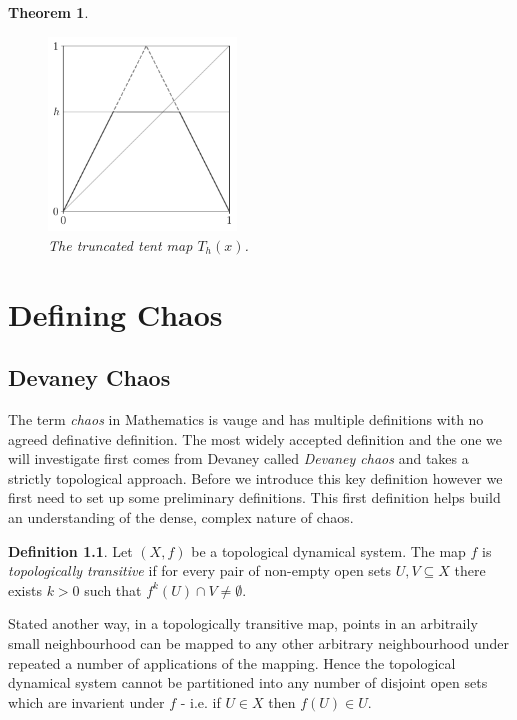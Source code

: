 \documentclass[11pt,a4paper,oneside]{memoir}
\theoremstyle{plain}
\newtheorem{thm}{Theorem}[chapter]
\theoremstyle{definition}
\newtheorem{defn}[thm]{Definition}
\begin{document}
\begin{thm}
    \begin{figure}[h]
        \centering
        \includegraphics[width=5cm]{truncated_tent}
        \caption{The truncated tent map $T_h(x)$.}
        \label{fig:truncated_tent}
    \end{figure}
\end{thm}

\chapter{Defining Chaos}

\section{Devaney Chaos}

The term \emph{chaos} in Mathematics is vauge and has multiple definitions with no agreed definative definition. The most widely accepted definition and the one we will investigate first comes from Devaney \cite{devaney} called \emph{Devaney chaos} and takes a strictly topological approach. Before we introduce this key definition however we first need to set up some preliminary definitions. This first definition helps build an understanding of the dense, complex nature of chaos.

\begin{defn}
    Let $(X, f)$ be a topological dynamical system. The map $f$ is \emph{topologically transitive} if for every pair of non-empty open sets $U, V \subseteq X$ there exists $k > 0$ such that $f^k(U) \cap V \neq \emptyset$.
\end{defn}

Stated another way, in a topologically transitive map, points in an arbitraily small neighbourhood can be mapped to any other arbitrary neighbourhood under repeated a number of applications of the mapping. Hence the topological dynamical system cannot be partitioned into any number of disjoint open sets which are invarient under $f$ - i.e. if $U \in X$ then $f(U) \in U$.
\end{document}
